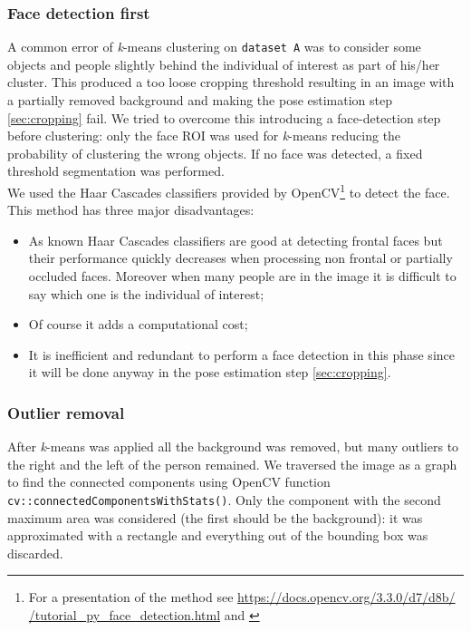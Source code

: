 \documentclass{article}
\begin{document}
		\subsubsection{Face detection first}
		A common error of \textit{k}-means clustering on \verb|dataset A| was to consider some objects and people slightly behind the individual of interest as part of his/her cluster. This produced a too loose cropping threshold resulting in an image with a partially removed background and making the pose estimation step \ref{sec:cropping} fail. We tried to overcome this introducing a face-detection step before clustering: only the face ROI was used for \textit{k}-means reducing the probability of clustering the wrong objects. If no face was detected, a fixed threshold segmentation was performed. \\
		We used the Haar Cascades classifiers provided by OpenCV\footnote{For a presentation of the method see \href{https://docs.opencv.org/3.3.0/d7/d8b/tutorial_py_face_detection.html}{https://docs.opencv.org/3.3.0/d7/d8b/ \\
		/tutorial\_py\_face\_detection.html} and \citep{ViolaJones}} to detect the face. \\
		This method has three major disadvantages:
		\begin{itemize}
			\item As known Haar Cascades classifiers are good at detecting frontal faces but their performance quickly decreases when processing non frontal or partially occluded faces. Moreover when many people are in the image it is difficult to say which one is the individual of interest;
			\item Of course it adds a computational cost;
			\item It is inefficient and redundant to perform a face detection in this phase since it will be done anyway in the pose estimation step \ref{sec:cropping}.
		\end{itemize}

		\subsubsection{Outlier removal}
		After \textit{k}-means was applied all the background was removed, but many outliers to the right and the left of the person remained.
		We traversed the image as a graph to find the connected components using OpenCV function \verb|cv::connectedComponentsWithStats()|. Only the component with the second maximum area was considered (the first should be the background): it was approximated with a rectangle and everything out of the bounding box was discarded.
\end{document}
